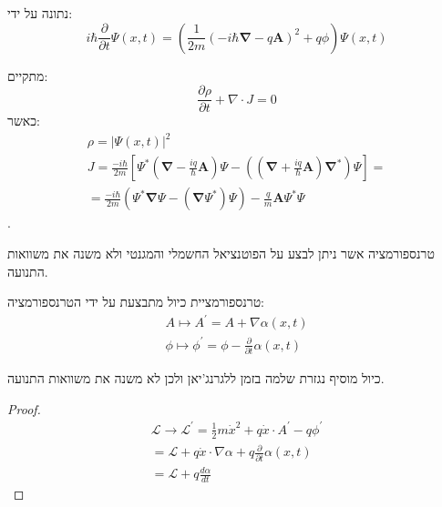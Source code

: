 \documentclass{tstextbook}
\begin{document}
\begin{proposition}
נתונה על ידי:
$$i\hbar{\frac{\partial}{\partial t}}\Psi(x,t)=\left({\frac{1}{2m}}\left(-i\hbar\mathbf{\nabla}-q\mathbf{A}\right)^{2}+q\phi\right)\Psi(x,t)$$

\end{proposition}
\begin{corollary}
מתקיים:
$${\frac{\partial\rho}{\partial t}}+\nabla\cdot J=0$$
כאשר:
$$\begin{gather}\rho=|\Psi(x,t)|^{2}\\ J=\frac{-i\hbar}{2m}\left[\Psi^{*}\left(\mathbf{\nabla}-\frac{iq}{\hbar}\mathbf{A}\right)\Psi-\left(\left(\mathbf{\nabla}+\frac{iq}{\hbar}\mathbf{A}\right)\mathbf{\nabla}^{*}\right)\Psi\right]=\\=\frac{-i\hbar}{2m}\left(\Psi^{*}\mathbf{\nabla}\Psi-\left( \mathbf{\nabla}\Psi^{*} \right)\Psi\right)-\frac{q}{m}\mathbf{A}\Psi^{*}\Psi 
\end{gather}$$
.

\end{corollary}
\begin{definition}
טרנספורמציה אשר ניתן לבצע על הפוטנציאל החשמלי והמגנטי ולא משנה את משוואות התנועה.

\end{definition}
\begin{proposition}
טרנספורמציית כיול מתבצעת על ידי הטרנספורמציה:
$$\begin{array}{l}{{A\mapsto A^{\prime}=A+\nabla\!\alpha(x,t)}}\\ {{\phi\mapsto\phi^{\prime}=\phi-\frac{\partial}{\partial t}\alpha(x,t)}}\end{array}$$

\end{proposition}
\begin{proposition}
כיול מוסיף נגזרת שלמה בזמן ללגרנג'יאן ולכן לא משנה את משוואות התנועה.

\end{proposition}
\begin{proof}
$$\begin{array}{c}{{{\mathcal{L}}\rightarrow{\mathcal{L}}^{\prime}=\frac{1}{2}m{\dot{x}}^{2}+q{\dot{x}}\cdot A^{\prime}-q\phi^{\prime}}}\\ {{{}={\mathcal{L}}+q{\dot{x}}\cdot\nabla\alpha+q\frac{\partial}{\partial t}\alpha(x,t)}}\\ {{{}={\mathcal{L}}+q\frac{d\alpha}{d t}}}\end{array}$$

\end{proof}
\end{document}
